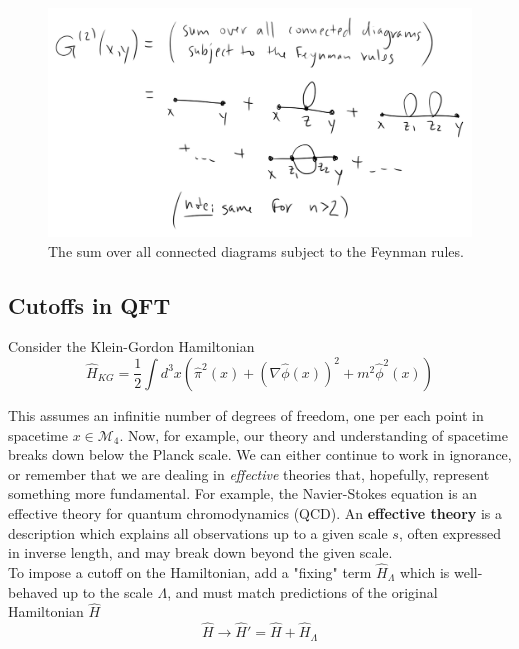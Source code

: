 \begin{figure}[H]
	\centering
	\includegraphics[scale=0.6]{images/allconnected.png}
	\caption{The sum over all connected diagrams subject to the Feynman rules.}
\end{figure}

\subsection*{Cutoffs in QFT}

\noindent Consider the Klein-Gordon Hamiltonian
\begin{equation}
\hat{H}_{KG} = \frac{1}{2} \int d^3 x \left( \hat{\pi}^2(x) + (\nabla \hat{\phi} (x))^2 + m^2 \hat{\phi}^2(x) \right)
\end{equation}

\noindent This assumes an infinitie number of degrees of freedom, one per each point in spacetime $x \in \mathcal{M}_4$. Now, for example, our theory and understanding of spacetime breaks down below the Planck scale. We can either continue to work in ignorance, or remember that we are dealing in \textit{effective} theories that, hopefully, represent something more fundamental. For example, the Navier-Stokes equation is an effective theory for quantum chromodynamics (QCD). An \textbf{effective theory} is a description which explains all observations up to a given scale $s$, often expressed in inverse length, and may break down beyond the given scale. \\

\noindent To impose a cutoff on the Hamiltonian, add a "fixing" term $\hat{H}_\Lambda$ which is well-behaved up to the scale $\Lambda$, and must match predictions of the original Hamiltonian $\hat{H}$
\begin{equation}
\hat{H} \to \hat{H}' = \hat{H} + \hat{H}_\Lambda
\end{equation}

